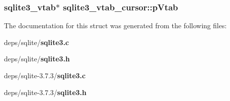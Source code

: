 \subsubsection{\setlength{\rightskip}{0pt plus 5cm}\bf{sqlite3\_\-vtab}$\ast$ \bf{sqlite3\_\-vtab\_\-cursor::p\-Vtab}}\label{structsqlite3__vtab__cursor_a94d21e499e768f8fec19423396f8e8c}




The documentation for this struct was generated from the following files:\begin{CompactItemize}
\item 
deps/sqlite/\bf{sqlite3.c}\item 
deps/sqlite/\bf{sqlite3.h}\item 
deps/sqlite-3.7.3/\bf{sqlite3.c}\item 
deps/sqlite-3.7.3/\bf{sqlite3.h}\end{CompactItemize}
